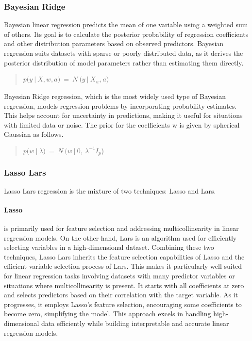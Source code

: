 \subsubsection{Bayesian Ridge}
Bayesian linear regression predicts the mean of one variable using a weighted sum of others. Its goal is to calculate the posterior probability of regression coefficients and other distribution parameters based on observed predictors.  Bayesian regression suits datasets with sparse or poorly distributed data, as it derives the posterior distribution of model parameters rather than estimating them directly. 
\begin{quote}
    \(p(y\ |\ X,w,a)\  = \ N\ (y\ |\ X_{w}{,a)}_{}\)
\end{quote}
Bayesian Ridge regression, which is the most widely used type of Bayesian regression, models regression problems by incorporating probability estimates. This helps account for uncertainty in predictions, making it useful for situations with limited data or noise. The prior for the coefficients w is given by spherical Gaussian as follows.

\begin{quote}
    \(p(w\ |\ \lambda)\  = \ N\ (w\ |\ 0,\ \lambda^{- 1}I_{p}\))
\end{quote}

\subsubsection{Lasso Lars}
Lasso Lars regression is the mixture of two techniques: Lasso and Lars. 
\paragraph{Lasso} is primarily used for feature selection and addressing multicollinearity in linear regression models. On the other hand, Lars is an algorithm used for efficiently selecting variables in a high-dimensional dataset. Combining these two techniques, Lasso Lars inherits the feature selection capabilities of Lasso and the efficient variable selection process of Lars. This makes it particularly well suited for linear regression tasks involving datasets with many predictor variables or situations where multicollinearity is present. 
It starts with all coefficients at zero and selects predictors based on their correlation with the target variable. As it progresses, it employs Lasso’s feature selection, encouraging some coefficients to become zero, simplifying the model. This approach excels in handling high-dimensional data efficiently while building interpretable and accurate linear regression models.

